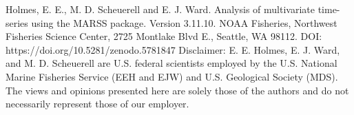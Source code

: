

\thispagestyle{empty}
\vspace*{14cm}
\vfil
\begin{flushleft}

Holmes, E. E., M. D. Scheuerell and E. J. Ward. Analysis of multivariate time-series using the MARSS package. Version 3.11.10. NOAA Fisheries, Northwest Fisheries Science Center, 2725 Montlake Blvd E., Seattle, WA 98112. DOI: https://doi.org/10.5281/zenodo.5781847
\newline
\newline
Disclaimer: E. E. Holmes, E. J. Ward, and M. D. Scheuerell are U.S. federal scientists employed by the U.S. National Marine Fisheries Service (EEH and EJW) and U.S. Geological Society (MDS).  The views and opinions presented here are solely those of the authors and do not necessarily represent those of our employer.

\end{flushleft}


